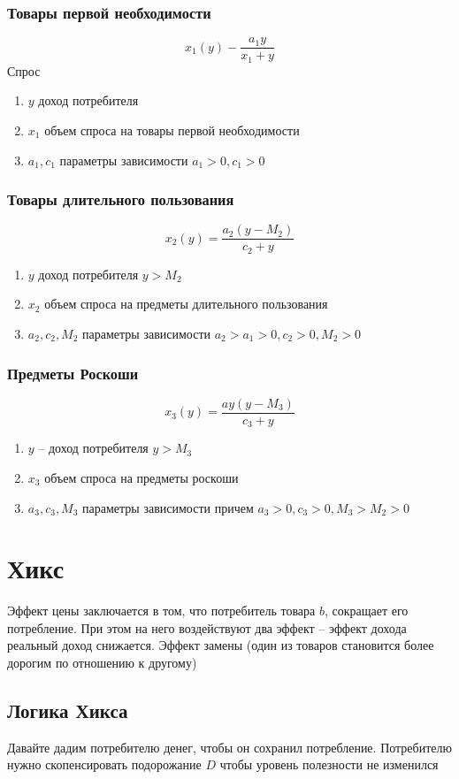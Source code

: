 \documentclass[14pt]{extarticle}
\begin{document}
 \subsubsection{Товары первой необходимости}
 \begin{equation}
 x_1(y) - \frac{a_1 y}{x_1 + y}
 \end{equation} 
 Спрос
  \begin{enumerate}
 	\item $y$ доход потребителя
	\item  $x_1$ объем спроса на товары первой необходимости
	\item $a_1,c_1$ параметры зависимости $a_1>0,c_1>0$
 \end{enumerate}
 \subsubsection{Товары длительного пользования}
 \begin{equation}
 x_2(y) = 
 \frac{a_2 (y - M_2)}{c_2 + y}
 \end{equation} 
 \begin{enumerate}
	 \item $y$ доход потребителя  $y>M_2$
	\item $x_2$ объем спроса на предметы длительного 
		пользования
	\item $a_2,c_2,M_2$ параметры зависимости $a_2>a_1>0, c_2 >0, M_2 > 0$
 \end{enumerate}
 \subsubsection{Предметы Роскоши}
 \begin{equation}
 x_3(y) = \frac{a y (y - M_3)}{c_3 + y}
 \end{equation} 
 \begin{enumerate}
 	\item $y$ -- доход потребителя  $y > M_3$
	\item $x_3$ объем спроса на предметы роскоши
	\item $a_3,c_3,M_3$ параметры зависимости причем 
		$a_3>0,c_3>0,M_3>M_2>0$
 \end{enumerate}
 \section{Хикс}
 Эффект цены заключается в том, что
 потребитель товара $b$,
 сокращает его потребление.
 При этом на него воздействуют
 два эффект -- эффект дохода 
 реальный доход снижается. 
 Эффект замены (один из товаров становится более дорогим по
 отношению к другому)

 \subsection{Логика Хикса}
 Давайте дадим потребителю
 денег, чтобы он сохранил потребление.
 Потребителю нужно скопенсировать подорожание
 $D$ чтобы уровень полезности не изменился
\end{document}
